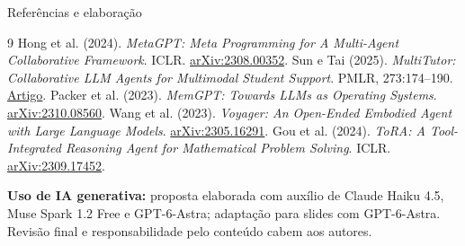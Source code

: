 \documentclass[aspectratio=169,11pt]{beamer}
\begin{document}
\begin{frame}{Referências e elaboração}
  \footnotesize
  \begin{thebibliography}{9}
    \setlength{\itemsep}{1mm}
     Hong et al. (2024). \textit{MetaGPT: Meta Programming for A Multi-Agent Collaborative Framework}. ICLR.
      \href{https://arxiv.org/abs/2308.00352}{arXiv:2308.00352}.
     Sun e Tai (2025). \textit{MultiTutor: Collaborative LLM Agents for Multimodal Student Support}. PMLR, 273:174--190.
      \href{https://proceedings.mlr.press/v273/sun25a.html}{Artigo}.
     Packer et al. (2023). \textit{MemGPT: Towards LLMs as Operating Systems}.
      \href{https://arxiv.org/abs/2310.08560}{arXiv:2310.08560}.
     Wang et al. (2023). \textit{Voyager: An Open-Ended Embodied Agent with Large Language Models}.
      \href{https://arxiv.org/abs/2305.16291}{arXiv:2305.16291}.
     Gou et al. (2024). \textit{ToRA: A Tool-Integrated Reasoning Agent for Mathematical Problem Solving}. ICLR.
      \href{https://arxiv.org/abs/2309.17452}{arXiv:2309.17452}.
  \end{thebibliography}
  \vspace{1mm}
  \textbf{Uso de IA generativa:} proposta elaborada com auxílio de Claude Haiku 4.5,
  Muse Spark 1.2 Free e GPT-6-Astra; adaptação para slides com GPT-6-Astra.
  Revisão final e responsabilidade pelo conteúdo cabem aos autores.
\end{frame}
\end{document}
